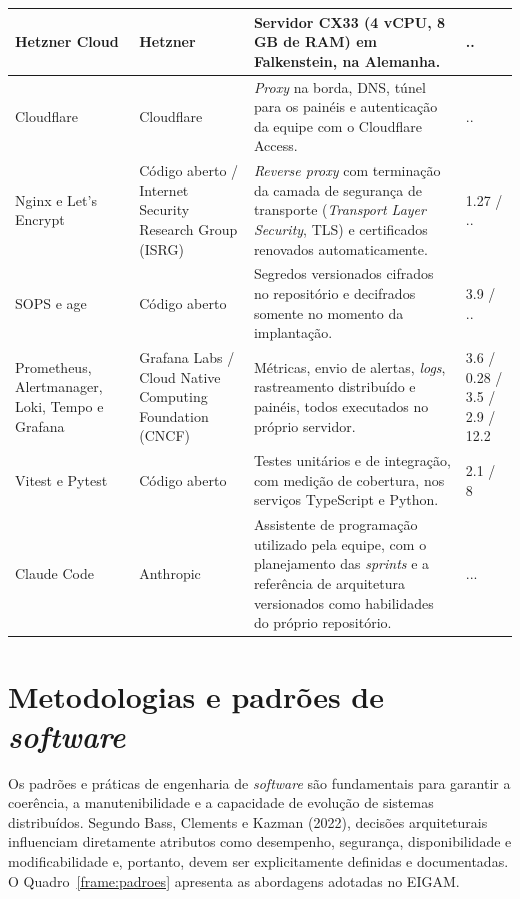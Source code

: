 {\begin{longtable}{|L{3.2cm}|L{2.8cm}|L{6.7cm}|L{1.5cm}|}
Hetzner Cloud & Hetzner & Servidor CX33 (4 vCPU, 8 GB de RAM) em Falkenstein, na Alemanha. & .. \\ \hline
Cloudflare & Cloudflare & \textit{Proxy} na borda, DNS, túnel para os painéis e autenticação da equipe com o Cloudflare Access. & .. \\ \hline
Nginx e Let's Encrypt & Código aberto / Internet Security Research Group (ISRG) & \textit{Reverse proxy} com terminação da camada de segurança de transporte (\textit{Transport Layer Security}, TLS) e certificados renovados automaticamente. & 1.27 / .. \\ \hline
SOPS e age & Código aberto & Segredos versionados cifrados no repositório e decifrados somente no momento da implantação. & 3.9 / .. \\ \hline
Prometheus, Alertmanager, Loki, Tempo e Grafana & Grafana Labs / Cloud Native Computing Foundation (CNCF) & Métricas, envio de alertas, \textit{logs}, rastreamento distribuído e painéis, todos executados no próprio servidor. & 3.6 / 0.28 / 3.5 / 2.9 / 12.2 \\ \hline
Vitest e Pytest & Código aberto & Testes unitários e de integração, com medição de cobertura, nos serviços TypeScript e Python. & 2.1 / 8 \\ \hline
Claude Code & Anthropic & Assistente de programação utilizado pela equipe, com o planejamento das \textit{sprints} e a referência de arquitetura versionados como habilidades do próprio repositório. & ... \\ \hline

\end{longtable}
}

\section{Metodologias e padrões de \textit{software}}

Os padrões e práticas de engenharia de \textit{software} são fundamentais para garantir a coerência, a manutenibilidade e a capacidade de evolução de sistemas distribuídos. Segundo Bass, Clements e Kazman (2022), decisões arquiteturais influenciam diretamente atributos como desempenho, segurança, disponibilidade e modificabilidade e, portanto, devem ser explicitamente definidas e documentadas. O Quadro~\ref{frame:padroes} apresenta as abordagens adotadas no EIGAM.

